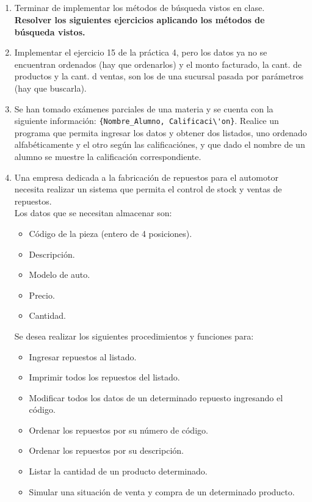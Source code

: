 \documentclass[a4paper,10pt]{article}
\begin{document}
~\\ \\ \\ \\

\begin{enumerate}

\item Terminar de implementar los m\'etodos de b\'usqueda  vistos en clase.\\

\textbf{Resolver los siguientes ejercicios aplicando los m\'etodos de b\'usqueda vistos.}

\item Implementar el ejercicio 15 de la pr\'actica 4, pero los datos ya no se encuentran ordenados (hay que ordenarlos) y el monto facturado, la cant. de productos y la cant. d ventas, son los de una sucursal pasada por par\'ametros (hay que buscarla). 

\item Se han tomado ex\'amenes parciales de una materia y se cuenta con la siguiente informaci\'on: \verb-{Nombre_Alumno, Calificaci\'on}-. Realice un programa que permita ingresar los datos y obtener dos listados, uno ordenado alfab\'eticamente y el otro seg\'un las calificaci\'ones, y que dado el nombre de un alumno se muestre la calificaci\'on correspondiente.

\item Una empresa dedicada a la fabricaci\'on de repuestos para el automotor necesita realizar un sistema que permita el control de stock y ventas de repuestos.\\
Los datos que se necesitan almacenar son:
\begin{itemize}
    \item[-] C\'odigo de la pieza (entero de 4 posiciones).
    \item[-] Descripci\'on.
    \item[-] Modelo de auto.
    \item[-] Precio.
    \item[-] Cantidad.
\end{itemize}
Se desea realizar los siguientes procedimientos y funciones para:
\begin{itemize}
    \item[-] Ingresar repuestos al listado.
    \item[-] Imprimir todos los repuestos del listado.
    \item[-] Modificar todos los datos de un determinado repuesto ingresando el c\'odigo.
    \item[-] Ordenar los repuestos por su n\'umero de c\'odigo.
    \item[-] Ordenar los repuestos por su descripci\'on.
    \item[-] Listar la cantidad de un producto determinado.
    \item[-] Simular una situaci\'on de venta y compra de un determinado producto. 
\end{itemize}


\end{enumerate}
\end{document}
